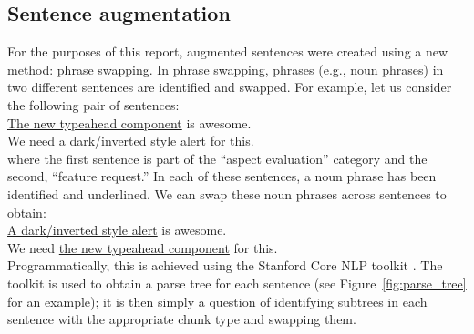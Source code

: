 \documentclass[letterpaper, 12 pt, conference]{ieeeconf}
\begin{document}
\subsection{Sentence augmentation}
For the purposes of this report, augmented sentences were created using a new method: phrase swapping. In phrase swapping, phrases (e.g., noun phrases) in two different sentences are identified and swapped. For example, let us consider the following pair of sentences:\\[0.35em]
\indent{}\ul{The new typeahead component} is awesome.\\
\indent{}We need \ul{a dark/inverted style alert} for this.\\[0.45em]
\noindent{}where the first sentence is part of the ``aspect evaluation'' category and the second, ``feature request.'' In each of these sentences, a noun phrase has been identified and underlined. We can swap these noun phrases across sentences to obtain:\\[0.35em]
\indent{}\ul{A dark/inverted style alert} is awesome.\\
\indent{}We need \ul{the new typeahead component} for this.\\[1em]
\indent{}Programmatically, this is achieved using the Stanford Core NLP toolkit \cite{StanfordCoreNLP}. The toolkit is used to obtain a parse tree for each sentence (see Figure~\ref{fig:parse_tree} for an example); it is then simply a question of identifying subtrees in each sentence with the appropriate chunk type and swapping them. 
\end{document}
